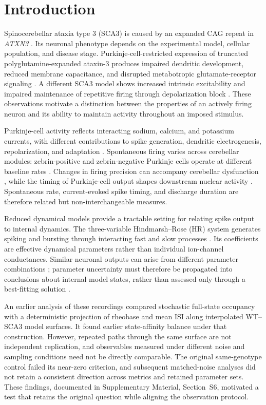 \documentclass[utf8]{FrontiersinHarvard}
\newcommand{\sref}[1]{Supplementary Material, Section~#1}
\begin{document}
\section{Introduction}\label{sec:intro}
Spinocerebellar ataxia type 3 (SCA3) is caused by an expanded CAG repeat in \textit{ATXN3} \citep{kawaguchi1994}. Its neuronal phenotype depends on the experimental model, cellular population, and disease stage. Purkinje-cell-restricted expression of truncated polyglutamine-expanded ataxin-3 produces impaired dendritic development, reduced membrane capacitance, and disrupted metabotropic glutamate-receptor signaling \citep{oue2009,konno2014}. A different SCA3 model shows increased intrinsic excitability and impaired maintenance of repetitive firing through depolarization block \citep{shakkottai2011}. These observations motivate a distinction between the properties of an actively firing neuron and its ability to maintain activity throughout an imposed stimulus.

Purkinje-cell activity reflects interacting sodium, calcium, and potassium currents, with different contributions to spike generation, dendritic electrogenesis, repolarization, and adaptation \citep{raman1999,deschutter1994}. Spontaneous firing varies across cerebellar modules: zebrin-positive and zebrin-negative Purkinje cells operate at different baseline rates \citep{zhou2014}. Changes in firing precision can accompany cerebellar dysfunction \citep{walter2006}, while the timing of Purkinje-cell output shapes downstream nuclear activity \citep{person2012}. Spontaneous rate, current-evoked spike timing, and discharge duration are therefore related but non-interchangeable measures.

Reduced dynamical models provide a tractable setting for relating spike output to internal dynamics. The three-variable Hindmarsh--Rose (HR) system generates spiking and bursting through interacting fast and slow processes \citep{hr1984}. Its coefficients are effective dynamical parameters rather than individual ion-channel conductances. Similar neuronal outputs can arise from different parameter combinations \citep{prinz2004,achard2006,taylor2009}; parameter uncertainty must therefore be propagated into conclusions about internal model states, rather than assessed only through a best-fitting solution \citep{gutenkunst2007,raue2009}.

An earlier analysis of these recordings compared stochastic full-state occupancy with a deterministic projection of rheobase and mean ISI along interpolated WT--SCA3 model surfaces. It found earlier state-affinity balance under that construction. However, repeated paths through the same surface are not independent replication, and observables measured under different noise and sampling conditions need not be directly comparable. The original same-genotype control failed its near-zero criterion, and subsequent matched-noise analyses did not retain a consistent direction across metrics and retained parameter sets. These findings, documented in \sref{S6}, motivated a test that retains the original question while aligning the observation protocol.
\end{document}
